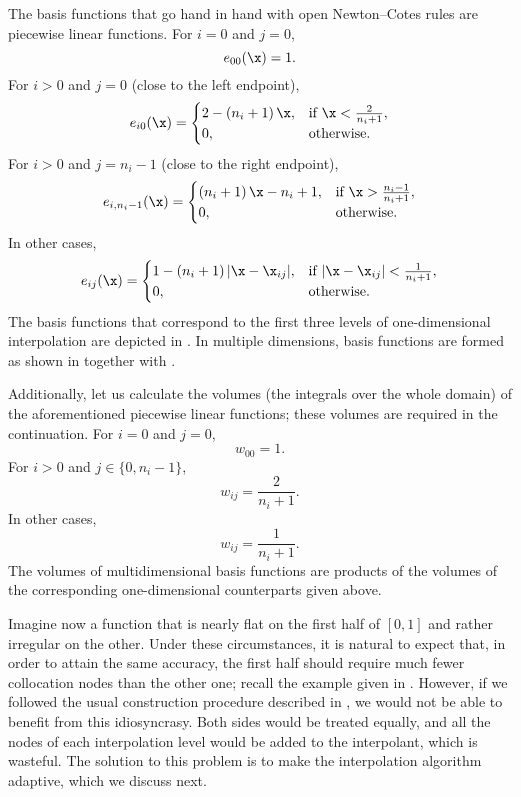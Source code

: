 The basis functions that go hand in hand with open Newton--Cotes rules are
piecewise linear functions. For $i = 0$ and $j = 0$,
\[
  e_{00}(\x) = 1.
\]
For $i > 0$ and $j = 0$ (close to the left endpoint),
\[
  e_{i0}(\x) =
  \begin{cases}
    2 - \left(n_i + 1\right) \x, & \text{if } \x < \frac{2}{n_i + 1}, \\
    0, & \text{otherwise}.
  \end{cases}
\]
For $i > 0$ and $j = n_i - 1$ (close to the right endpoint),
\[
  e_{i, n_i - 1}(\x) =
  \begin{cases}
    \left(n_i + 1\right) \x - n_i + 1, & \text{if } \x > \frac{n_i - 1}{n_i + 1}, \\
    0, & \text{otherwise}.
  \end{cases}
\]
In other cases,
\[
  e_{ij}(\x) =
  \begin{cases}
    1 - \left(n_i + 1\right)|\x - \x_{ij}|, & \text{if } |\x - \x_{ij}| < \frac{1}{n_i + 1}, \\
    0, & \text{otherwise}.
  \end{cases}
\]
The basis functions that correspond to the first three levels of one-dimensional
interpolation are depicted in . In multiple dimensions, basis
functions are formed as shown in  together with
.

Additionally, let us calculate the volumes (the integrals over the whole domain)
of the aforementioned piecewise linear functions; these volumes are required in
the continuation. For $i = 0$ and $j = 0$,
\[
  w_{00} = 1.
\]
For $i > 0$ and $j \in \{ 0, n_i - 1 \}$,
\[
  w_{ij} = \frac{2}{n_i + 1}.
\]
In other cases,
\[
  w_{ij} = \frac{1}{n_i + 1}.
\]
The volumes of multidimensional basis functions are products of the volumes of
the corresponding one-dimensional counterparts given above.

Imagine now a function that is nearly flat on the first half of $[0, 1]$ and
rather irregular on the other. Under these circumstances, it is natural to
expect that, in order to attain the same accuracy, the first half should require
much fewer collocation nodes than the other one; recall the example given in
. However, if we followed the usual construction
procedure described in , we would not be able to
benefit from this idiosyncrasy. Both sides would be treated equally, and all the
nodes of each interpolation level would be added to the interpolant, which is
wasteful. The solution to this problem is to make the interpolation algorithm
adaptive, which we discuss next.


